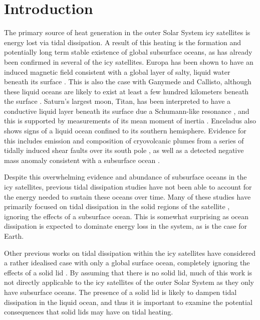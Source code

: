 \newpage
\section{Introduction}


The primary source of heat generation in the outer Solar System icy satellites is energy lost via tidal dissipation. A result of this heating is the formation and potentially long term stable existence of global subsurface oceans, as has already been confirmed in several of the icy satellites. Europa has been shown to have an induced magnetic field consistent with a global layer of salty, liquid water beneath its surface \citep{zimmer2000subsurface, kivelson2000galileo, hand2007empirical}. This is also the case with Ganymede and Callisto, although these liquid oceans are likely to exist at least a few hundred kilometers beneath the surface \citep{zimmer2000subsurface, kivelson2000galileo}. Saturn's largest moon, Titan, has been interpreted to have a conductive liquid layer beneath its surface due a Schumann-like resonance \citep{beghin2010titan}, and this is supported by measurements of its mean moment of inertia \citep{bills2011rotational}. Enceladus also shows signs of a liquid ocean confined to its southern hemisphere. Evidence for this includes emission and composition of cryovolcanic plumes from a series of tidally induced shear faults over its south pole \citep{hansen2011composition}, as well as a detected negative mass anomaly consistent with a subsurface ocean \citep{iess2014gravity}. 

Despite this overwhelming evidence and abundance of subsurface oceans in the icy satellites, previous tidal dissipation studies have not been able to account for the energy needed to sustain these oceans over time. Many of these studies have primarily focused on tidal dissipation in the solid regions of the satellite \citep[e.g.,][]{moore2000tidal, roberts2008tidal, beuthe2013spatial}, ignoring the effects of a subsurface ocean. This is somewhat surprising as ocean dissipation is expected to dominate energy loss in the system, as is the case for Earth.

Other previous works on tidal dissipation within the icy satellites have considered a rather idealised case with only a global surface ocean, completely ignoring the effects of a solid lid \citep{sagan1982tide, sears1995tidal, sohl1995tidal, tyler2008strong, matsuyama2014tidal}. By assuming that there is no solid lid, much of this work is not directly applicable to the icy satellites of the outer Solar System as they only have subsurface oceans. The presence of a solid lid is likely to dampen tidal dissipation in the liquid ocean, and thus it is important to examine the potential consequences that solid lids may have on tidal heating.

